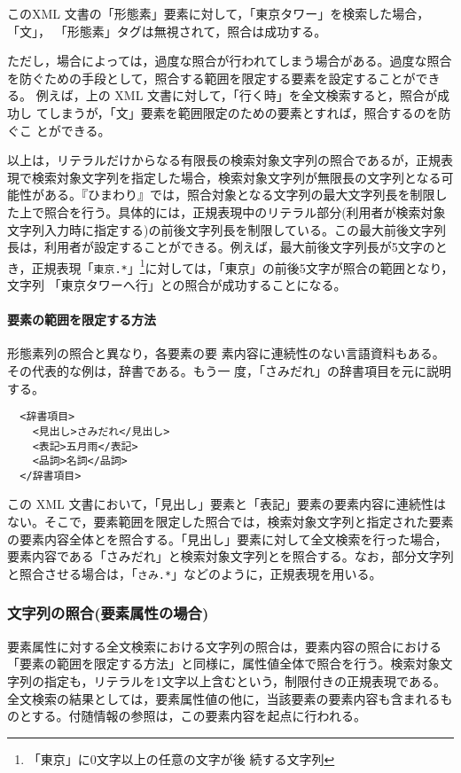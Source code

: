このXML 文書の「形態素」要素に対して，「東京タワー」を検索した場合，「文」，
「形態素」タグは無視されて，照合は成功する。


ただし，場合によっては，過度な照合が行われてしまう場合がある。過度な照合
を防ぐための手段として，照合する範囲を限定する要素を設定することができる。
例えば，上の XML 文書に対して，「行く時」を全文検索すると，照合が成功し
てしまうが，「文」要素を範囲限定のための要素とすれば，照合するのを防ぐこ
とができる。

以上は，リテラルだけからなる有限長の検索対象文字列の照合であるが，正規表
現で検索対象文字列を指定した場合，検索対象文字列が無限長の文字列となる可
能性がある。『ひまわり』では，照合対象となる文字列の最大文字列長を制限し
た上で照合を行う。具体的には，正規表現中のリテラル部分(利用者が検索対象
文字列入力時に指定する)の前後文字列長を制限している。この最大前後文字列
長は，利用者が設定することができる。例えば，最大前後文字列長が5文字のと
き，正規表現「\verb+東京.*+」\footnote {「東京」に0文字以上の任意の文字が後
続する文字列}に対しては，「東京」の前後5文字が照合の範囲となり，文字列
「東京タワーへ行」との照合が成功することになる。



\paragraph{要素の範囲を限定する方法} 形態素列の照合と異なり，各要素の要
素内容に連続性のない言語資料もある。その代表的な例は，辞書である。もう一
度，「さみだれ」の辞書項目を元に説明する。

{\small \begin{verbatim}
  <辞書項目>
    <見出し>さみだれ</見出し>
    <表記>五月雨</表記>
    <品詞>名詞</品詞>
  </辞書項目>
\end{verbatim}}

この XML 文書において，「見出し」要素と「表記」要素の要素内容に連続性は
ない。そこで，要素範囲を限定した照合では，検索対象文字列と指定された要素
の要素内容全体とを照合する。「見出し」要素に対して全文検索を行った場合，
要素内容である「さみだれ」と検索対象文字列とを照合する。なお，部分文字列
と照合させる場合は，「\verb+さみ.*+」などのように，正規表現を用いる。


\subsubsection{文字列の照合(要素属性の場合)}
\label{sssec:文字列の照合(要素属性の場合)}
要素属性に対する全文検索における文字列の照合は，要素内容の照合における
「要素の範囲を限定する方法」と同様に，属性値全体で照合を行う。検索対象文
字列の指定も，リテラルを1文字以上含むという，制限付きの正規表現である。
全文検索の結果としては，要素属性値の他に，当該要素の要素内容も含まれるも
のとする。付随情報の参照は，この要素内容を起点に行われる。



